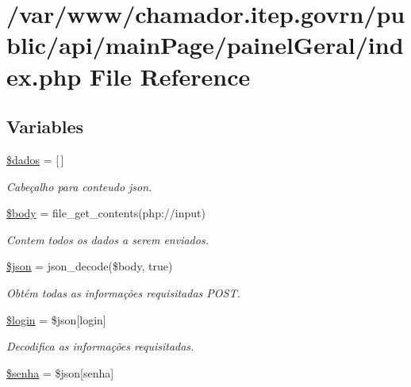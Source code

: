 \hypertarget{main_page_2painel_geral_2index_8php}{}\section{/var/www/chamador.itep.\+govrn/public/api/main\+Page/painel\+Geral/index.php File Reference}
\label{main_page_2painel_geral_2index_8php}
\subsection*{Variables}
\begin{DoxyCompactItemize}
\item 
\hyperlink{main_page_2painel_geral_2index_8php_a252370d95039a38fa11afab784725d58}{\$dados} = \mbox{[}$\,$\mbox{]}
\begin{DoxyCompactList}\small\item\em Cabeçalho para conteudo json. \end{DoxyCompactList}\item 
\hyperlink{main_page_2painel_geral_2index_8php_a26b9f9373f7bb79dfcf8a86dff086b45}{\$body} = file\+\_\+get\+\_\+contents(\textquotesingle{}php\+://input\textquotesingle{})
\begin{DoxyCompactList}\small\item\em Contem todos os dados a serem enviados. \end{DoxyCompactList}\item 
\hyperlink{main_page_2painel_geral_2index_8php_acedd13b51401130848ce18f4d5c52605}{\$json} = json\+\_\+decode(\$body, true)
\begin{DoxyCompactList}\small\item\em Obtém todas as informações requisitadas P\+O\+ST. \end{DoxyCompactList}\item 
\hyperlink{main_page_2painel_geral_2index_8php_afc31993e855f9631572adfedcfe6f34b}{\$login} = \$json\mbox{[}\textquotesingle{}login\textquotesingle{}\mbox{]}
\begin{DoxyCompactList}\small\item\em Decodifica as informações requisitadas. \end{DoxyCompactList}\item 
\hyperlink{main_page_2painel_geral_2index_8php_a3678c8769c9698fd30581c1016c5f475}{\$senha} = \$json\mbox{[}\textquotesingle{}senha\textquotesingle{}\mbox{]}

\end{DoxyCompactItemize}
